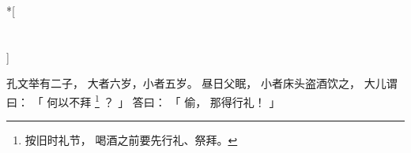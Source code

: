 
\switchcolumn[0]*[\section{}\label{sec:文举小子偷酒}]

孔文举有二子，
大者六岁，小者五岁。
昼日父眠，
小者床头盗酒饮之，
大儿谓曰：
「
    何以不拜%
    \footnote{%
        按旧时礼节，
        喝酒之前要先行礼、祭拜。
    }%
    ？
」
答曰：
「
    偷，
    那得行礼！
」

\switchcolumn



